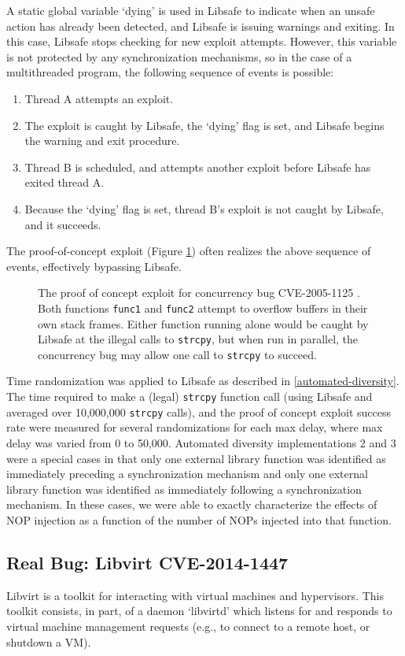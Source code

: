 A static global variable `dying' is used in Libsafe to indicate when an unsafe action has already been detected, and Libsafe is issuing warnings and exiting.  In this case, Libsafe stops checking for new exploit attempts.  However, this variable is not protected by any synchronization mechanisms, so in the case of a multithreaded program, the following sequence of events is possible:
\begin{enumerate}
	\item Thread A attempts an exploit.
	\item The exploit is caught by Libsafe, the `dying' flag is set, and Libsafe begins the warning and exit procedure.
	\item Thread B is scheduled, and attempts another exploit before Libsafe has exited thread A.
	\item Because the `dying' flag is set, thread B's exploit is not caught by Libsafe, and it succeeds.
\end{enumerate}
The proof-of-concept exploit (Figure \ref{fig_poc})\cite{Bugtraq13190} often realizes the above sequence of events, effectively bypassing Libsafe.
\begin{figure}
	
	\caption{The proof of concept exploit for concurrency bug CVE-2005-1125 \cite{CVE-2005-1125}.  Both functions \texttt{func1} and \texttt{func2} attempt to overflow buffers in their own stack frames.  Either function running alone would be caught by Libsafe at the illegal calls to \texttt{strcpy}, but when run in parallel, the concurrency bug may allow one call to \texttt{strcpy} to succeed.}
	\label{fig_poc}
\end{figure}

Time randomization was applied to Libsafe as described in \autoref{automated-diversity}.
The time required to make a (legal) \texttt{strcpy} function call (using Libsafe and averaged over 10,000,000 \texttt{strcpy} calls), and the proof of concept exploit success rate were measured for several randomizations for each max delay, where max delay was varied from 0 to 50,000.
Automated diversity implementations 2 and 3 were a special cases in that only one external library function was identified as immediately preceding a synchronization mechanism and only one external library function was identified as immediately following a synchronization mechanism.
In these cases, we were able to exactly characterize the effects of NOP injection as a function of the number of NOPs injected into that function.
\subsection{Real Bug: Libvirt CVE-2014-1447}
Libvirt \cite{libvirt} is a toolkit for interacting with virtual machines and hypervisors.
This toolkit consists, in part, of a daemon `libvirtd' which listens for and
responds to virtual machine management requests (e.g., to connect to a remote host, or shutdown a VM).

